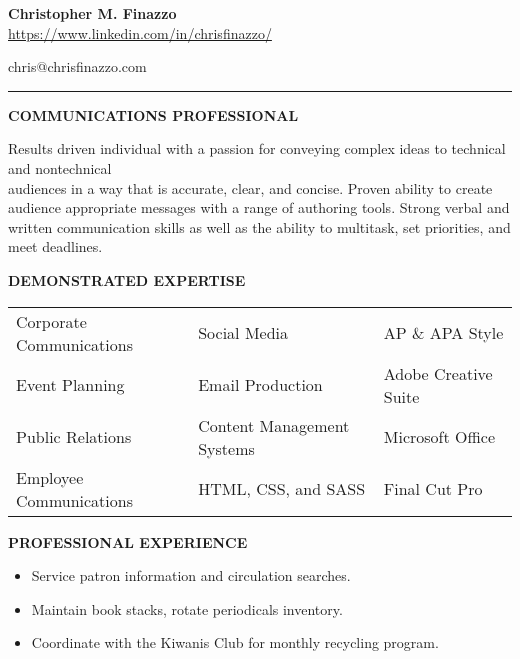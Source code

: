 \documentclass[letterpaper,12pt]{article}
\begin{document}
\begin{center}
\textbf
{\Large{Christopher M. Finazzo}} \\
\href{https://www.linkedin.com/in/chrisfinazzo/}{https://www.linkedin.com/in/chrisfinazzo/}
\end{center}
\hfill \hfill {chris@chrisfinazzo.com}
\vspace*{0.20cm}
\hrule
\vspace*{0.20cm}
\begin{center}
\textbf
{COMMUNICATIONS PROFESSIONAL}
\end{center}
\noindent
\begin{raggedright}
Results driven individual with a passion for conveying complex ideas to technical and nontechnical\\ audiences in a way that is accurate, clear, and concise. Proven ability to create audience appropriate messages with a range of authoring tools. Strong verbal and written communication skills as well as the ability to multitask, set priorities, and meet deadlines.\\
\end{raggedright}
\begin{center}
\textbf{DEMONSTRATED EXPERTISE}\\
\end{center}
\begin{center}
\begin{tabular}{lll}
Corporate Communications & Social Media & AP \& APA Style\\
Event Planning & Email Production & Adobe Creative Suite\\
Public Relations & Content Management Systems & Microsoft Office\\
Employee Communications & HTML, CSS, and SASS & Final Cut Pro\\
\end{tabular}
\end{center}
\begin{center}
\textbf{PROFESSIONAL EXPERIENCE}
\end{center}
%
\begin{itemize}[nosep]
\item
  Service patron information and circulation searches.
\item
  Maintain book stacks, rotate periodicals inventory.
\item
  Coordinate with the Kiwanis Club for monthly recycling program.
\end{itemize}
\end{document}
